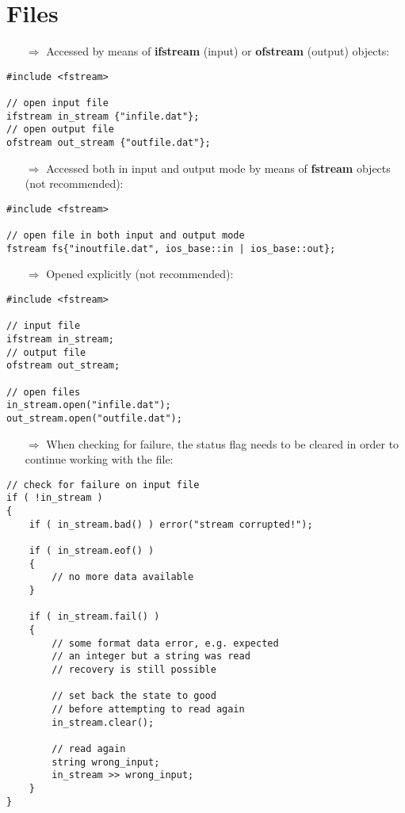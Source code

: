\documentclass[10pt]{article}
\begin{document}
\section{Files}
\small
\begin{enumerate}
\item[$\Rightarrow$] Accessed by means of \textbf{ifstream} (input) or
\textbf{ofstream} (output) objects:
\end{enumerate}
\begin{lstlisting}
#include <fstream>

// open input file 
ifstream in_stream {"infile.dat"};
// open output file
ofstream out_stream {"outfile.dat"};
\end{lstlisting}
\begin{enumerate}
\item[$\Rightarrow$] Accessed both in input and output mode by means of \textbf{fstream} objects (not recommended):
\end{enumerate}
\begin{lstlisting}
#include <fstream>

// open file in both input and output mode
fstream fs{"inoutfile.dat", ios_base::in | ios_base::out};
\end{lstlisting}
\begin{enumerate}
\item[$\Rightarrow$] Opened explicitly (not recommended):
\end{enumerate}
\begin{lstlisting}
#include <fstream>

// input file 
ifstream in_stream;
// output file
ofstream out_stream;

// open files
in_stream.open("infile.dat");
out_stream.open("outfile.dat");
\end{lstlisting}
\begin{enumerate}
\item[$\Rightarrow$] When checking for failure, the status flag needs to be cleared
in order to continue working with the file:
\end{enumerate}
\begin{lstlisting}
// check for failure on input file
if ( !in_stream )
{
    if ( in_stream.bad() ) error("stream corrupted!");
    
    if ( in_stream.eof() )
    { 
        // no more data available
    }
    
    if ( in_stream.fail() )
    {
        // some format data error, e.g. expected
        // an integer but a string was read
        // recovery is still possible
        
        // set back the state to good 
        // before attempting to read again
        in_stream.clear();
        
        // read again
        string wrong_input;
        in_stream >> wrong_input;
    }
}
\end{lstlisting}
\end{document}
